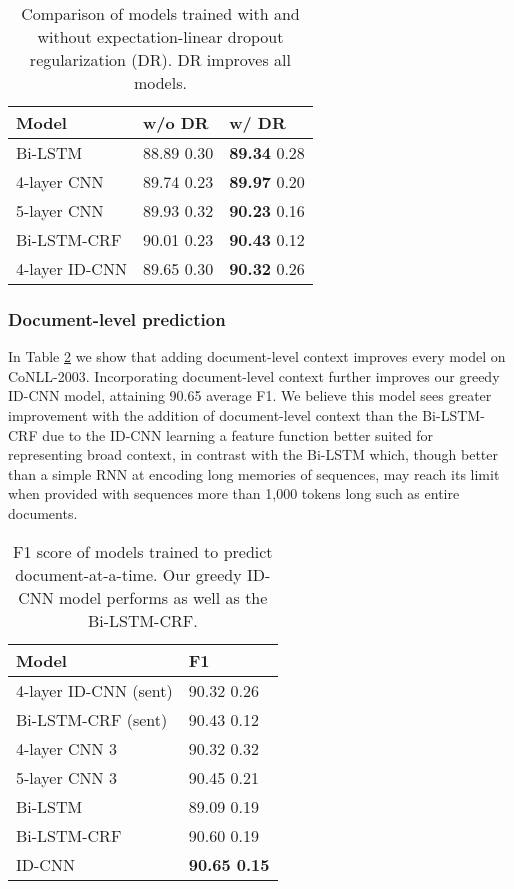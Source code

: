 \documentclass[11pt,letterpaper]{article}
\begin{document}
\begin{table}
\begin{tabular}{lll}
    Model & w/o DR & w/ DR \\ \hline \hline
    Bi-LSTM & 88.89  0.30 & {\bf 89.34}  0.28 \\
    4-layer CNN & 89.74  0.23 & {\bf 89.97}  0.20\\
    5-layer CNN & 89.93  0.32 & {\bf 90.23}  0.16\\
    Bi-LSTM-CRF & 90.01  0.23 & {\bf 90.43}  0.12 \\
    4-layer ID-CNN & 89.65  0.30 & {\bf 90.32}  0.26 \\
  \end{tabular}
  \caption{Comparison of models trained with and without expectation-linear dropout regularization (DR). DR improves all models. \label{dr-table}}
\end{table}

\subsubsection{Document-level prediction}

In Table \ref{doc-summary-table} we show that adding document-level context improves every model on CoNLL-2003. Incorporating document-level context further improves our greedy ID-CNN model, attaining 90.65 average F1. We believe this model sees greater improvement with the addition of document-level context than the Bi-LSTM-CRF due to the ID-CNN learning a feature function better suited for representing broad context, in contrast with the Bi-LSTM which, though better than a simple RNN at encoding long memories of sequences, may reach its limit when provided with sequences more than 1,000 tokens long such as entire documents.

\begin{table}
\begin{tabular}{ll}
    Model & F1 \\ \hline \hline
    4-layer ID-CNN (sent) & 90.32  0.26 \\ Bi-LSTM-CRF (sent) & 90.43  0.12 \\ \hline 4-layer CNN  3 & 90.32  0.32 \\ 5-layer CNN  3 & 90.45  0.21 \\ Bi-LSTM & 89.09  0.19 \\ Bi-LSTM-CRF & 90.60  0.19 \\ ID-CNN & {\bf 90.65  0.15} \\ \end{tabular}
  \caption{F1 score of models trained to predict document-at-a-time. Our greedy ID-CNN model performs as well as the Bi-LSTM-CRF.\label{doc-summary-table}}
\end{table}
\end{document}
